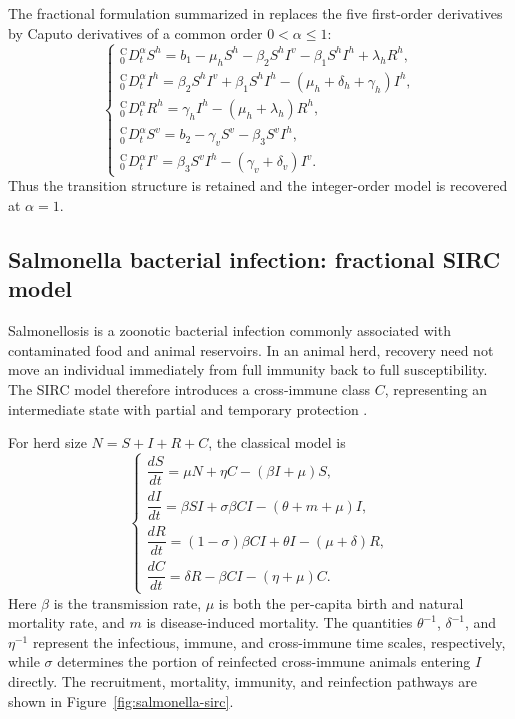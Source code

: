 \documentclass[00-main.tex]{subfiles}
\begin{document}
The fractional formulation summarized in \cite{Ch21} replaces the five first-order derivatives by Caputo derivatives of a common order $0<\alpha\leq1$:
\[
\begin{cases}
 {}_{0}^{\mathrm C}\!D_t^\alpha S^h=b_1-\mu_hS^h-\beta_2S^hI^v-\beta_1S^hI^h+\lambda_hR^h,\\[3pt]
 {}_{0}^{\mathrm C}\!D_t^\alpha I^h=\beta_2S^hI^v+\beta_1S^hI^h-(\mu_h+\delta_h+\gamma_h)I^h,\\[3pt]
 {}_{0}^{\mathrm C}\!D_t^\alpha R^h=\gamma_hI^h-(\mu_h+\lambda_h)R^h,\\[3pt]
 {}_{0}^{\mathrm C}\!D_t^\alpha S^v=b_2-\gamma_vS^v-\beta_3S^vI^h,\\[3pt]
 {}_{0}^{\mathrm C}\!D_t^\alpha I^v=\beta_3S^vI^h-(\gamma_v+\delta_v)I^v.
\end{cases}
\]
Thus the transition structure is retained and the integer-order model is recovered at $\alpha=1$.


\subsection{Salmonella bacterial infection: fractional SIRC model}

Salmonellosis is a zoonotic bacterial infection commonly associated with contaminated food and animal reservoirs.
In an animal herd, recovery need not move an individual immediately from full immunity back to full susceptibility.
The SIRC model therefore introduces a cross-immune class $C$, representing an intermediate state with partial and temporary protection \cite{Ch21,Rihan14}.

For herd size $N=S+I+R+C$, the classical model is
\[
\begin{cases}
 \dfrac{dS}{dt}=\mu N+\eta C-(\beta I+\mu)S,\\[8pt]
 \dfrac{dI}{dt}=\beta SI+\sigma\beta CI-(\theta+m+\mu)I,\\[8pt]
 \dfrac{dR}{dt}=(1-\sigma)\beta CI+\theta I-(\mu+\delta)R,\\[8pt]
 \dfrac{dC}{dt}=\delta R-\beta CI-(\eta+\mu)C.
\end{cases}
\]
Here $\beta$ is the transmission rate, $\mu$ is both the per-capita birth and natural mortality rate, and $m$ is disease-induced mortality.
The quantities $\theta^{-1}$, $\delta^{-1}$, and $\eta^{-1}$ represent the infectious, immune, and cross-immune time scales, respectively, while $\sigma$ determines the portion of reinfected cross-immune animals entering $I$ directly.
The recruitment, mortality, immunity, and reinfection pathways are shown in Figure~\ref{fig:salmonella-sirc}.
\end{document}
